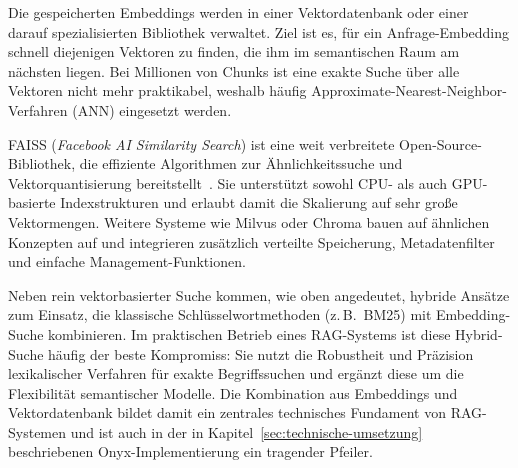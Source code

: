 Die gespeicherten Embeddings werden in einer Vektordatenbank oder einer darauf spezialisierten Bibliothek verwaltet.
Ziel ist es, für ein Anfrage-Embedding schnell diejenigen Vektoren zu finden, die ihm im semantischen Raum am nächsten liegen.
Bei Millionen von Chunks ist eine exakte Suche über alle Vektoren nicht mehr praktikabel, weshalb häufig Approximate-Nearest-Neighbor-Verfahren (ANN) eingesetzt werden.

FAISS (\textit{Facebook AI Similarity Search}) ist eine weit verbreitete Open-Source-Bibliothek, die effiziente Algorithmen zur Ähnlichkeitssuche und Vektorquantisierung bereitstellt~\cite{johnson2017faiss}.
Sie unterstützt sowohl CPU- als auch GPU-basierte Indexstrukturen und erlaubt damit die Skalierung auf sehr große Vektormengen.
Weitere Systeme wie Milvus oder Chroma bauen auf ähnlichen Konzepten auf und integrieren zusätzlich verteilte Speicherung, Metadatenfilter und einfache Management-Funktionen.

Neben rein vektorbasierter Suche kommen, wie oben angedeutet, hybride Ansätze zum Einsatz, die klassische Schlüsselwortmethoden (z.\,B.\ BM25) mit Embedding-Suche kombinieren.
Im praktischen Betrieb eines RAG-Systems ist diese Hybrid-Suche häufig der beste Kompromiss:
Sie nutzt die Robustheit und Präzision lexikalischer Verfahren für exakte Begriffssuchen und ergänzt diese um die Flexibilität semantischer Modelle.
Die Kombination aus Embeddings und Vektordatenbank bildet damit ein zentrales technisches Fundament von RAG-Systemen und ist auch in der in Kapitel~\ref{sec:technische-umsetzung} beschriebenen Onyx-Implementierung ein tragender Pfeiler.
